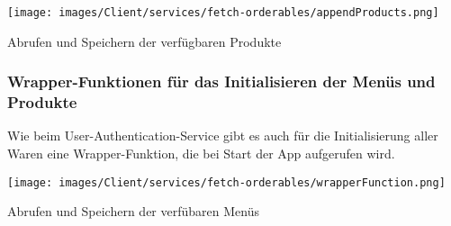\begin{code}
    \centering
    \texttt{[image: images/Client/services/fetch-orderables/appendProducts.png]}
    \caption{Abrufen und Speichern der verfügbaren Produkte}
\end{code}

\subsubsection{Wrapper-Funktionen für das Initialisieren der Menüs und Produkte}

Wie beim User-Authentication-Service gibt es auch für die Initialisierung aller Waren eine Wrapper-Funktion,
die bei Start der App aufgerufen wird.

\begin{code}
    \centering
    \texttt{[image: images/Client/services/fetch-orderables/wrapperFunction.png]}
    \caption{Abrufen und Speichern der verfübaren Menüs}
\end{code}



